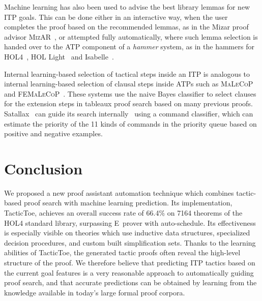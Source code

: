 \documentclass[runningheads,a4paper,draft]{svjour3}
\def\holfour{\textsf{HOL4}\xspace}
\def\isabelle{\textsf{Isabelle}\xspace}
\def\hollight{\textsf{HOL Light}\xspace}
\def\eprover{\textsf{E~prover}\xspace}
\def\sml{\textsf{SML}\xspace}
\def\sledgehammer{\textsf{Sledgehammer}\xspace}
\def\tactictoe{\textsf{TacticToe}\xspace}
\begin{document}

Machine learning has also been used to advise the best library lemmas for new
ITP goals.
This can be done either in an interactive way, when the user completes the
proof based on the recommended lemmas, as in the Mizar proof advisor
\textsc{MizAR}~\cite{Urb04-MPTP0,mizAR40}, or attempted fully automatically, where such lemma
selection is handed over to the ATP component of a \emph{hammer}
system, as in the hammers for \holfour~\cite{tgck-cpp15}, 
\hollight~\cite{holyhammer} and \isabelle~\cite{BlanchetteGKKU16}.

Internal learning-based selection of tactical steps inside an ITP is analogous
to internal learning-based selection of clausal steps inside ATPs such as
\textsc{MaLeCoP}~\cite{malecop} and \textsc{FEMaLeCoP}~\cite{femalecop}. These
systems
use the naive Bayes classifier to  select clauses for the extension steps in
tableaux proof search based on many previous proofs. Satallax~\cite{Brown2012a}
can guide its
search internally~\cite{mllax} using a command classifier, which can estimate
the priority of the 11 kinds of
commands in the priority queue based on positive and negative examples.

\section{Conclusion}\label{sec:concl}
We proposed a new proof assistant automation technique which combines
tactic-based proof search with machine learning prediction.
Its implementation, \tactictoe, achieves an overall success rate of 66.4\%
on 7164 theorems of the \holfour standard library, surpassing \eprover
with auto-schedule. Its
effectiveness is especially visible on
theories which use inductive data structures, specialized decision procedures,
and custom built simplification sets.
Thanks to the learning abilities of \tactictoe, the generated tactic proofs
often reveal the high-level structure of the proof. %
We therefore believe that predicting ITP tactics based on the current goal
features is a very reasonable approach to automatically guiding proof search,
and that accurate predictions can be obtained by learning from the knowledge
available in today's large formal proof corpora.
\end{document}
